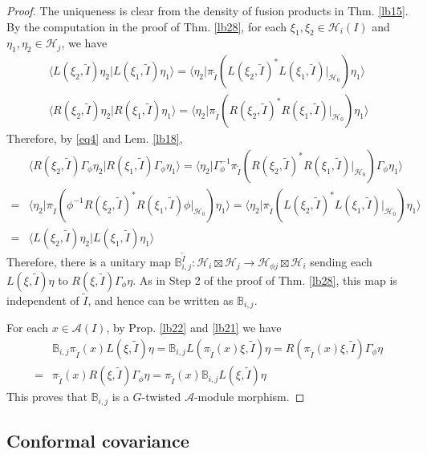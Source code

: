 \documentclass[11pt,b5paper,notitlepage]{article}
\theoremstyle{definition}
\theoremstyle{plain}
\newcommand{\wtd}{\widetilde}
\newcommand{\bk}[1]{\langle {#1}\rangle}
\newcommand{\mbb}{\mathbb}
\renewcommand{\Bbb}{\mathbb B}
\newcommand{\MA}{\mathcal A}
\newcommand{\MH}{\mathcal H}
\numberwithin{equation}{section}
\begin{document}
\begin{appendices}
\begin{proof}
The uniqueness is clear from the density of fusion products in Thm. \ref{lb15}. By the computation in the proof of Thm. \ref{lb28}, for each $\xi_1,\xi_2\in\MH_i(I)$ and $\eta_1,\eta_2\in\MH_j$, we have
\begin{subequations}\label{eq22}
\begin{gather}
\bk{L(\xi_2,\wtd I)\eta_2|L(\xi_1,\wtd I)\eta_1}=\bk{\eta_2|\pi_{\wtd I}(L(\xi_2,\wtd I)^*L(\xi_1,\wtd I)|_{\MH_0})\eta_1}\\
\bk{R(\xi_2,\wtd I)\eta_2|R(\xi_1,\wtd I)\eta_1}=\bk{\eta_2|\pi_{\wtd I}(R(\xi_2,\wtd I)^*R(\xi_1,\wtd I)|_{\MH_0})\eta_1}
\end{gather}
\end{subequations}
Therefore, by \eqref{eq4} and Lem. \ref{lb18},
\begin{align*}
&\bk{R(\xi_2,\wtd I)\Gamma_\phi\eta_2|R(\xi_1,\wtd I)\Gamma_\phi\eta_1}=\bk{\eta_2|\Gamma_\phi^{-1}\pi_{\wtd I}(R(\xi_2,\wtd I)^*R(\xi_1,\wtd I)|_{\MH_0})\Gamma_\phi\eta_1}\\
=&\bk{\eta_2|\pi_{\wtd I}(\phi^{-1}R(\xi_2,\wtd I)^*R(\xi_1,\wtd I)\phi|_{\MH_0})\eta_1}=\bk{\eta_2|\pi_{\wtd I}(L(\xi_2,\wtd I)^*L(\xi_1,\wtd I)|_{\MH_0})\eta_1}\\
=&\bk{L(\xi_2,\wtd I)\eta_2|L(\xi_1,\wtd I)\eta_1}
\end{align*}
Therefore, there is a unitary map $\mbb B_{i,j}^{\wtd I}:\MH_i\boxtimes\MH_j\rightarrow\MH_{\phi j}\boxtimes\MH_i$ sending each $L(\xi,\wtd I)\eta$ to $R(\xi,\wtd I)\Gamma_\phi\eta$. As in Step 2 of the proof of Thm. \ref{lb28}, this map is independent of $\wtd I$, and hence can be written as $\Bbb_{i,j}$.

For each $x\in\MA(I)$, by Prop. \ref{lb22} and \ref{lb21} we have
\begin{align*}
&\Bbb_{i,j}\pi_{\wtd I}(x)L(\xi,\wtd I)\eta=\Bbb_{i,j}L(\pi_{\wtd I}(x)\xi,\wtd I)\eta=R(\pi_{\wtd I}(x)\xi,\wtd I)\Gamma_\phi\eta\\
=&\pi_{\wtd I}(x)R(\xi,\wtd I)\Gamma_\phi\eta=\pi_{\wtd I}(x)\Bbb_{i,j}L(\xi,\wtd I)\eta
\end{align*} 
This proves that $\Bbb_{i,j}$ is a $G$-twisted $\MA$-module morphism.
\end{proof}





\subsection{Conformal covariance}



\end{appendices}
\end{document}
